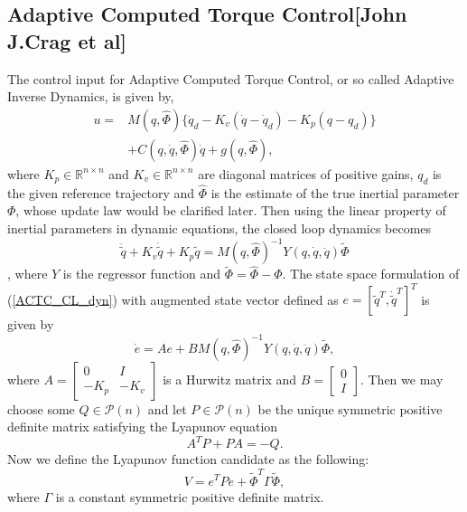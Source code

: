 \documentclass[Afour,sageh,times]{sagej}
\begin{document}
\subsection{Adaptive Computed Torque Control[John J.Crag et al]}
The control input for Adaptive Computed Torque Control, or so called Adaptive Inverse Dynamics, is given by,
\begin{align*}
u =& M(q,\hat{\Phi})\{\ddot{q}_{d}-K_{v}(\dot{q}-\dot{q}_{d})-K_{p}(q-q_{d})\} \nonumber\\
&+C(q,\dot{q},\hat{\Phi})\dot{q}+g(q,\hat{\Phi}),
\end{align*}
where $K_p\in\mathbb{R}^{n\times n}$ and $K_{v}\in\mathbb{R}^{n\times n}$ are diagonal matrices of positive gains, $q_{d}$ is the given reference trajectory and $\hat{\Phi}$ is the estimate of the true inertial parameter $\Phi$, whose update law would be clarified later. Then using the linear property of inertial parameters in dynamic equations, the closed loop dynamics becomes
\begin{equation}
\ddot{\tilde{q}}+K_{v}\dot{\tilde{q}}+K_{p}\tilde{q}=M(q,\hat{\Phi})^{-1}Y(q,\dot{q},\ddot{q})\tilde{\Phi} \label{ACTC_CL_dyn}
\end{equation}
, where $Y$ is the regressor function and $\tilde{\Phi} =\hat{\Phi}-\Phi$. The state space formulation of (\ref{ACTC_CL_dyn}) with augmented state vector defined as $e=[\tilde{q}^{T}, \dot{\tilde{q}}^{T}]^{T}$ is given by 
\begin{equation*}
\dot{e} = Ae+BM(q,\hat{\Phi})^{-1}Y(q,\dot{q},\ddot{q})\tilde{\Phi},
\end{equation*}
where $A = \left[\begin{array}{cc} 0 & I \\ -K_{p} & -K_{v}\end{array}\right]$ is a Hurwitz matrix and $B=\left[\begin{array}{c} 0 \\ I\end{array}\right]$. Then we may choose some $Q \in \mathcal{P}(n)$ and let $P \in \mathcal{P}(n)$ be the unique symmetric positive definite matrix satisfying the Lyapunov equation
\begin{equation*}
A^{T}P + PA = -Q.
\end{equation*}
Now we define the Lyapunov function candidate as the following:
\begin{equation*}
V = e^{T}Pe + \tilde{\Phi}^{T}\Gamma\tilde{\Phi},
\end{equation*}
where $\Gamma$ is a constant symmetric positive definite matrix.
\end{document}
